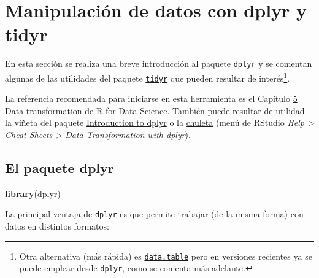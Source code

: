 \documentclass[
]{book}
\newenvironment{Shaded}{\begin{snugshade}}{\end{snugshade}}
\newcommand{\FunctionTok}[1]{\textcolor[rgb]{0.13,0.29,0.53}{\textbf{#1}}}
\newcommand{\NormalTok}[1]{#1}
\begin{document}
\hypertarget{dplyr}{%
\section{Manipulación de datos con dplyr y tidyr}\label{dplyr}}

En esta sección se realiza una breve introducción al paquete \href{https://dplyr.tidyverse.org}{\texttt{dplyr}} y se comentan algunas de las utilidades del paquete \href{https://tidyr.tidyverse.org}{\texttt{tidyr}} que pueden resultar de interés\footnote{Otra alternativa (más rápida) es \href{https://rdatatable.gitlab.io/data.table}{\texttt{data.table}} pero en versiones recientes ya se puede emplear desde \texttt{dplyr}, como se comenta más adelante.}.

La referencia recomendada para iniciarse en esta herramienta es el Capítulo \href{http://r4ds.had.co.nz/transform.html}{5 Data transformation} de
\href{http://r4ds.had.co.nz}{R for Data Science}.
También puede resultar de utilidad la viñeta del paquete \href{https://dplyr.tidyverse.org/articles/dplyr.html}{Introduction to dplyr} o la \href{https://posit.co/wp-content/uploads/2022/10/data-transformation-1.pdf}{chuleta} (menú de RStudio \emph{Help \textgreater{} Cheat Sheets \textgreater{} Data Transformation with dplyr}).

\hypertarget{dplyr-pkg}{%
\subsection{El paquete dplyr}\label{dplyr-pkg}}

\begin{Shaded}
\begin{Highlighting}[]
\FunctionTok{library}\NormalTok{(dplyr)}
\end{Highlighting}
\end{Shaded}

La principal ventaja de \href{https://dplyr.tidyverse.org/index.html}{\texttt{dplyr}} es que permite trabajar (de la misma forma) con datos en distintos formatos:
\end{document}
